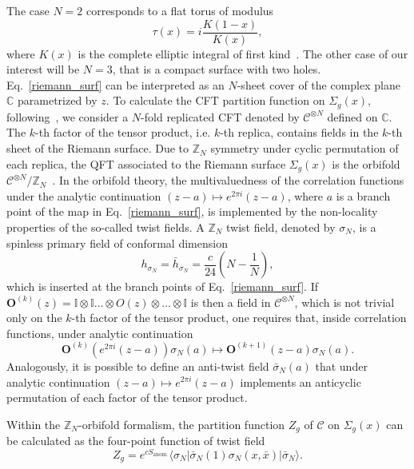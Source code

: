 \documentclass[a4paper,11pt]{article}
\begin{document}
The case $N=2$ corresponds to a flat torus of modulus 
\begin{equation}\label{tau}
 \tau(x)=i\frac{K(1-x)}{K(x)}, 
\end{equation}
where $K(x)$ is the complete elliptic integral of first 
kind~\cite{Whittaker}. The other case of our interest will be $N=3$, that
is a compact surface with two holes. 
Eq.~\eqref{riemann_surf} can be interpreted as an $N$-sheet cover of the complex plane $\mathbb C$ parametrized by $z$. To calculate the CFT partition function on $\Sigma_g(x)$, following~\cite{Lunin}, we consider a $N$-fold replicated CFT denoted by $\mathcal{C}^{\otimes N}$ defined on $\mathbb C$. The $k$-th factor of the tensor product, i.e. $k$-th replica, contains fields in the $k$-th sheet of the Riemann surface. 
Due to $\mathbb Z_N$ symmetry under cyclic permutation of each replica, the  QFT associated to the Riemann surface $\Sigma_g(x)$ is the orbifold $\mathcal{C}^{\otimes N}/\mathbb Z_N$~\cite{Dixon, Knizhnik}. 
In the orbifold theory, the multivaluedness of the correlation functions under the analytic continuation $(z-a)\mapsto e^{2\pi i}(z-a)$, where $a$ is a branch point of the map in Eq.~\eqref{riemann_surf}, is implemented by the non-locality properties of the so-called twist fields. A $\mathbb Z_N$ twist field, denoted by $\sigma_N$, is  a spinless primary field of conformal dimension~\cite{Knizhnik}
\begin{equation}
 h_{\sigma_N}=\bar{h}_{\sigma_N}=\frac{c}{24}\left(N-\frac{1}{N}\right),
\end{equation}
which is inserted at the branch points of Eq.~\eqref{riemann_surf}.
If $\boldsymbol{O}^{(k)}(z)=\mathbb I\otimes\mathbb I\dots\otimes O(z)\otimes\dots\otimes\mathbb I$ is then a field in $\mathcal C^{\otimes N}$, which is not trivial only on the $k$-th factor of the tensor product, one requires that, inside correlation functions, under analytic continuation
\begin{equation}
\label{nonloc}
 \boldsymbol {O}^{(k)}(e^{2\pi i}(z-a))\sigma_N(a)\mapsto \boldsymbol{O}^{(k+1)}(z-a)\sigma_N(a).
\end{equation}
Analogously, it is possible to define an anti-twist field $\bar{\sigma}_N(a)$ that under analytic continuation $(z-a)\mapsto e^{2\pi i}(z-a)$ implements an anticyclic permutation of each factor of the tensor product. 

Within the $\mathbb{Z}_N$-orbifold formalism, the partition function $Z_g$ of $\mathcal{C}$  on $\Sigma_g(x)$ can be calculated as the four-point function of twist field~\cite{Lunin}
\begin{equation}\label{partition_twist_correl}
 Z_g=e^{cS_{\text{anom.}}}\langle \sigma_N| \bar{\sigma}_N(1)\sigma_N(x, \bar{x})|\bar{\sigma}_N\rangle.
\end{equation}
\end{document}
